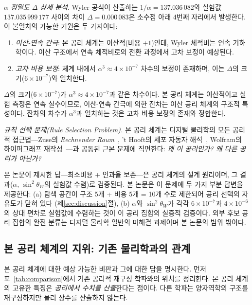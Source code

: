 \documentclass[entropy,article,submit,pdftex,oneauthor]{Definitions/mdpi}
\begin{document}
\textit{$\alpha$ 정밀도 $\Delta$ 상세 분석}. Wyler 공식이 산출하는 $1/\alpha = 137.036\,082$와 실험값 $137.035\,999\,177$ 사이의 차이 $\Delta = 0.000\,083$은 소수점 아래 4번째 자리에서 발생한다. 이 불일치의 가능한 기원은 두 가지이다:
\begin{enumerate}
\item \emph{이산-연속 간극}: 본 공리 체계는 이산적(비용 $+1$)인데, Wyler 체적비는 연속 기하학이다. 이산 구조에서 연속 체적비로의 전환 과정에서 고차 보정이 예상된다.
\item \emph{고차 비용 보정}: 체계 내에서 $\alpha^3 \approx 4 \times 10^{-7}$ 차수의 보정이 존재하며, 이는 $\Delta$의 크기($6 \times 10^{-7}$)와 일치한다.
\end{enumerate}
$\Delta$의 크기($6 \times 10^{-7}$)가 $\alpha^3 \approx 4 \times 10^{-7}$과 같은 차수이다. 본 공리 체계는 이산적이고 실험 측정은 연속 실수이므로, 이산-연속 간극에 의한 잔차는 이산 공리 체계의 구조적 특성이다. 잔차의 차수가 $\alpha^3$과 일치하는 것은 고차 비용 보정의 존재와 정합한다.

\emph{규칙 선택 문제(Rule Selection Problem).} 본 공리 체계는 디지털 물리학의 모든 공리적 접근법---Zuse의 \textit{Rechnender Raum}~\cite{zuse1969}, 't Hooft의 세포 자동자 해석~\cite{thooft2016}, Wolfram의 하이퍼그래프 재작성~\cite{wolfram2002}---과 공통된 근본 문제에 직면한다: \emph{왜 이 공리인가? 왜 다른 공리가 아닌가?}

본 논문이 제시한 답---최소비용 + 인과율 보존---은 공리 체계의 설계 원리이며, 그 결과($\alpha$, $\sin^2\theta_W$의 실험값 수렴)로 검증된다. 본 논문은 이 문제에 두 가지 부분 답변을 제공한다: (a) 탐색 공간이 구조 5개 + 비용 5개 = 10개 수로 제한되어 공리 선택의 자유도가 닫혀 있다 (제\ref{sec:discussion}절), (b) $\alpha$와 $\sin^2\theta_W$가 각각 $6 \times 10^{-7}$과 $4 \times 10^{-6}$의 상대 편차로 실험값에 수렴하는 것이 이 공리 집합의 실증적 검증이다. 외부 후보 공리 집합의 완전 분류는 디지털 물리학 일반의 미해결 과제이며 본 논문의 범위 밖이다.

\subsection{본 공리 체계의 지위: 기존 물리학과의 관계}

본 공리 체계에 대한 예상 가능한 비판과 그에 대한 답을 명시한다. 먼저 표~\ref{tab:comparison}에서 기존 공리적 재구성 학파와의 위치를 정리한다. 본 공리 체계의 고유한 특징은 \emph{공리에서 수치를 산출}한다는 점이다. 다른 학파는 양자역학의 구조를 재구성하지만 물리 상수를 산출하지 않는다.
\end{document}
